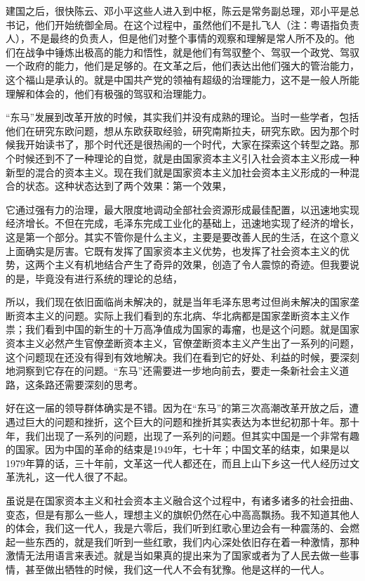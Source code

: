 \documentclass[UTF8, 12pt, a4paper]{ctexrep}
\begin{document}
建国之后，很快陈云、邓小平这些人进入到中枢，陈云是常务副总理，邓小平是总书记，他们开始统御全局。在这个过程中，虽然他们不是扎飞人（注：粤语指负责人），不是最终的负责人，但是他们对整个事情的观察和理解是常人所不及的。他们在战争中锤炼出极高的能力和悟性，就是他们有驾驭整个、驾驭一个政党、驾驭一个政府的能力，他们是足够的。在文革之后，他们表达出他们强大的管治能力，这个福山是承认的。就是中国共产党的领袖有超级的治理能力，这不是一般人所能理解和体会的，他们有极强的驾驭和治理能力。

“东马”发展到改革开放的时候，其实我们并没有成熟的理论。当时一些学者，包括他们在研究东欧问题，想从东欧获取经验，研究南斯拉夫，研究东欧。因为那个时候我开始读书了，那个时代还是很热闹的一个时代，大家在探索这个转型之路。那个时候还到不了一种理论的自觉，就是由国家资本主义引入社会资本主义形成一种新型的混合的资本主义。现在我们就是国家资本主义加社会资本主义形成的一种混合的状态。这种状态达到了两个效果：第一个效果，

它通过强有力的治理，最大限度地调动全部社会资源形成最佳配置，以迅速地实现经济增长。不但在完成，毛泽东完成工业化的基础上，迅速地实现了经济的增长，这是第一个部分。其实不管你是什么主义，主要是要改善人民的生活，在这个意义上面确实是厉害。它既有发挥了国家资本主义优势，也发挥了社会资本主义的优势，这两个主义有机地结合产生了奇异的效果，创造了令人震惊的奇迹。但我要说的是，毕竟没有进行系统的理论的总结，

所以，我们现在依旧面临尚未解决的，就是当年毛泽东思考过但尚未解决的国家垄断资本主义的问题。实际上我们看到的东北病、华北病都是国家垄断资本主义作祟；我们看到中国的新生的十万高净值成为国家的毒瘤，也是这个问题。就是国家资本主义必然产生官僚垄断资本主义，官僚垄断资本主义产生出了一系列的问题，这个问题现在还没有得到有效地解决。我们在看到它的好处、利益的时候，要深刻地洞察到它存在的问题。“东马”还需要进一步地向前去，要走一条新社会主义道路，这条路还需要深刻的思考。

好在这一届的领导群体确实是不错。因为在“东马”的第三次高潮改革开放之后，遭遇过巨大的问题和挫折，这个巨大的问题和挫折其实表达为本世纪初那十年。那十年，我们出现了一系列的问题，出现了一系列的问题。但其实中国是一个非常有趣的国家。因为中国的革命的结束是1949年，七十年；中国文革的结束，如果是以1979年算的话，三十年前，文革这一代人都还在，而且上山下乡这一代人经历过文革洗礼，这一代人很了不起。

虽说是在国家资本主义和社会资本主义融合这个过程中，有诸多诸多的社会扭曲、变态，但是有那么一些人，理想主义的旗帜仍然在心中高高飘扬。我不知道其他人的体会，我们这一代人，我是六零后，我们听到红歌心里边会有一种震荡的、会燃起一些东西的，就是我们听到一些红歌，我们内心深处依旧存在着一种激情，那种激情无法用语言来表述。就是当如果真的提出来为了国家或者为了人民去做一些事情，甚至做出牺牲的时候，我们这一代人不会有犹豫。他是这样的一代人。
\end{document}
